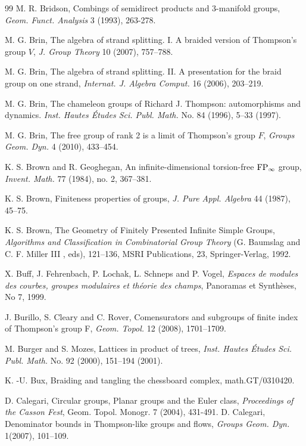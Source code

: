\documentclass[twoside]{irmaems}
\theoremstyle{plain}
\theoremstyle{definition}
\theoremstyle{remark}
\begin{document}
\begin{small}
\begin{thebibliography}{99}
M. R. Bridson, {   Combings of semidirect products and $3$-manifold groups},
{\em Geom. Funct. Analysis} 3 (1993), 263-278.

 M. G. Brin,  {The algebra of strand splitting. I. A braided version of Thompson's group $V$,}  {\em J. Group Theory}  10  (2007),   757--788.

 M. G. Brin,  {The algebra of strand splitting. II. A presentation for the braid group on one strand,}  {\em Internat. J. Algebra Comput.}  16  (2006),  203--219. 

M. G.  Brin,
The chameleon groups of Richard J. Thompson: automorphisms and dynamics.
{\em Inst. Hautes \'Etudes Sci. Publ. Math.} No. 84 (1996), 5--33 (1997).

M. G. Brin, The free group of rank 2 is a limit of Thompson's group $F$, 
{\em Groups Geom. Dyn.} 4 (2010), 433--454. 
   
K. S. Brown and R. Geoghegan, 
An infinite-dimensional torsion-free ${\rm FP}_{\infty }$ group, 
{\em Invent. Math.} 77 (1984), no. 2, 367--381. 
     
 K. S. Brown, { Finiteness properties of groups}, 
{\em J. Pure Appl. Algebra} 44 (1987), 45--75.     

K. S. Brown, { The Geometry of Finitely Presented Infinite Simple          
Groups}, {\em Algorithms and Classification in Combinatorial Group Theory}          
(G. Baumslag and C. F. Miller III , eds), 121--136, 
MSRI Publications, 23, Springer-Verlag, 1992.  


        
X. Buff, J. Fehrenbach, P. Lochak, L. Schneps and P. Vogel, 
{\em Espaces de modules des courbes, groupes modulaires et th\'eorie des champs}, Panoramas et Synth\`eses, No 7, 1999.


J. Burillo, S. Cleary and C. Rover, Comensurators and subgroups of finite
index of Thompson's group F, {\em Geom. Topol.} 12 (2008), 1701--1709.


M. Burger and S. Mozes, Lattices in product of trees, 
{\em  Inst. Hautes \'Etudes Sci. Publ. Math.}  No. 92  (2000), 151--194 (2001).

K. -U.  Bux, { Braiding and tangling the chessboard complex}, 
math.GT/0310420. 



  
D. Calegari, { Circular groups, Planar groups and the Euler class}, 
{\em Proceedings of the Casson Fest}, Geom. Topol. Monogr. 7 (2004), 431-491.    
D. Calegari, Denominator bounds in Thompson-like groups and
flows, {\em Groups Geom. Dyn.} 1(2007), 101--109.


\end{thebibliography}
\end{small}
\end{document}
